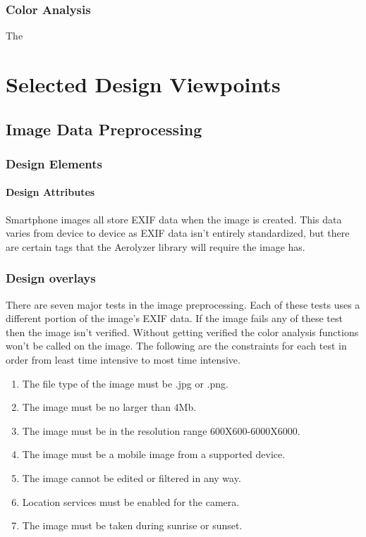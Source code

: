 \documentclass[onecolumn, draftclsnofoot,10pt, compsoc]{IEEEtran}
\begin{document}
\begin{singlespace}
		\subsubsection{Color Analysis}
        The 
\section{Selected Design Viewpoints}
	\subsection{Image Data Preprocessing}
      \subsubsection{Design Elements}
          \paragraph{Design Attributes}
          Smartphone images all store EXIF data when the image is created. This data varies from device to device as EXIF data isn't entirely standardized, but there are certain tags that the Aerolyzer library will require the image has.
      \subsubsection{Design overlays}
		There are seven major tests in the image preprocessing.
		Each of these tests uses a different portion of the image's EXIF data.
		If the image fails any of these test then the image isn't verified.
		Without getting verified the color analysis functions won't be called on the image.
		The following are the constraints for each test in order from least time intensive to most time intensive.
		\begin{enumerate}
			\item The file type of the image must be .jpg or .png.
			\item The image must be no larger than 4Mb.
			\item The image must be in the resolution range 600X600-6000X6000.
			\item The image must be a mobile image from a supported device.
			\item The image cannot be edited or filtered in any way.
			\item Location services must be enabled for the camera.
			\item The image must be taken during sunrise or sunset.
		\end{enumerate}

\end{singlespace}
\end{document}

